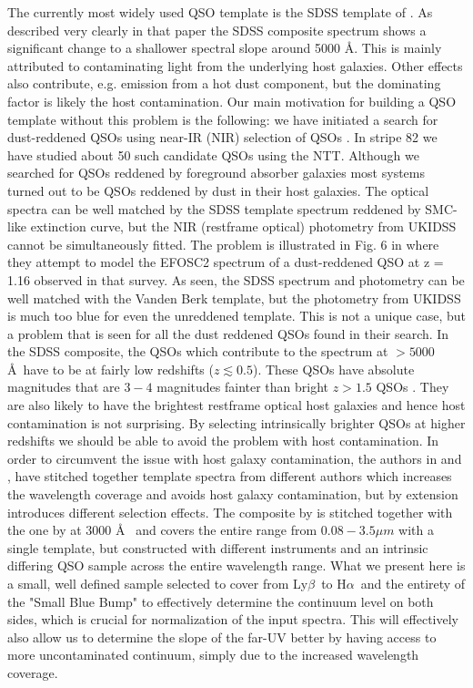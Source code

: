 \documentclass{aa}    %
\newcommand{\lyb}{Ly$\beta$}
\newcommand{\ha}{H$\alpha$}
\begin{document}
The currently most widely used QSO template is the SDSS template of \citet{VandenBerk2001}. As described very clearly in that paper the SDSS composite spectrum shows a significant change to a shallower spectral slope around 5000 \AA. This is mainly attributed to contaminating light from the underlying host galaxies. Other effects also contribute, e.g. emission from a hot dust component, but the dominating factor is likely the host contamination. Our main motivation for building a QSO template without this problem is the following: we have initiated a search for dust-reddened QSOs using near-IR (NIR) selection of QSOs \citep{Fynbo2013, Krogager2015}. In stripe 82 we have studied about 50 such candidate QSOs using the NTT. Although we searched for QSOs reddened by foreground absorber galaxies most systems turned out to be QSOs reddened by dust in their host galaxies. The optical spectra can be well matched by the SDSS template spectrum reddened by SMC-like extinction curve, but the NIR (restframe optical) photometry from UKIDSS cannot be simultaneously fitted. The problem is illustrated in Fig. 6 in \citet{Fynbo2013} where they attempt to model the EFOSC2 spectrum of a dust-reddened QSO at z = 1.16 observed in that survey. As seen, the SDSS spectrum and photometry can be well matched with the Vanden Berk template, but the photometry from UKIDSS is much too blue for even the unreddened template. This is not a unique case, but a problem that is seen for all the dust reddened QSOs found in their search.
In the SDSS composite, the QSOs which contribute to the spectrum at $ > 5000$ \AA~have to be at fairly low redshifts ($z \lesssim  0.5$). These QSOs have absolute magnitudes that are $3-4$ magnitudes fainter than bright $z > 1.5$ QSOs \citep[e.g.,][their Fig.~1]{VandenBerk2001}. They are also likely to have the brightest restframe optical host galaxies and hence host contamination is not surprising. By selecting intrinsically brighter QSOs at higher redshifts we should be able to avoid the problem with host contamination.
In order to circumvent the issue with host galaxy contamination, the authors in \citet{Fynbo2013} and \citet{Krogager2015}, have stitched together template spectra from different authors which increases the wavelength coverage and avoids host galaxy contamination, but by extension introduces different selection effects. The composite by \citet{Glikman2006} is stitched together with the one by \citet{VandenBerk2001} at $3000$ \AA~ and covers the entire range from $0.08 - 3.5 \mu m$ with a single template, but constructed with different instruments and an intrinsic differing QSO sample across the entire wavelength range. 
What we present here is a small, well defined sample selected to cover from \lyb~to \ha~and the entirety of the "Small Blue Bump" to effectively determine the continuum level on both sides, which is crucial for normalization of the input spectra. This will effectively also allow us to determine the slope of the far-UV better by having access to more uncontaminated continuum, simply due to the increased wavelength coverage. 
\end{document}
